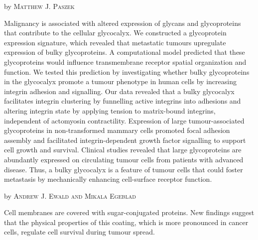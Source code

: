 \documentclass[10pt,a4paper]{article}
\newcommand{\NewsItem}[1]{ %
\usefont{T1}{fvs}{n}{n} %
\vspace{24pt}\large #1\vspace{3pt} %
\par \normalsize \normalfont}
\newcommand{\NewsAuthor}[1]{ %
\hfill by \textsc{#1} \vspace{20pt} %
\par \normalfont}
\begin{document}
\begin{multicols}{2} %


\NewsItem{{\color{hugoteal}{The cancer glycocalyx mechanically primes integrin-mediated growth and survival}}}
\NewsAuthor{Matthew J. Paszek}

Malignancy is associated with altered expression of glycans and glycoproteins that contribute to the cellular glycocalyx.
We constructed a glycoprotein expression signature, which revealed that metastatic tumours upregulate expression of bulky glycoproteins.
A computational model predicted that these glycoproteins would influence transmembrane receptor spatial organization and function.
We tested this prediction by investigating whether bulky glycoproteins in the glycocalyx promote a tumour phenotype in human cells by increasing integrin adhesion and signalling.
Our data revealed that a bulky glycocalyx facilitates integrin clustering by funnelling active integrins into adhesions and altering integrin state by applying tension to matrix-bound integrins, independent of actomyosin contractility.
Expression of large tumour-associated glycoproteins in non-transformed mammary cells promoted focal adhesion assembly and facilitated integrin-dependent growth factor signalling to support cell growth and survival.
Clinical studies revealed that large glycoproteins are abundantly expressed on circulating tumour cells from patients with advanced disease.
Thus, a bulky glycocalyx is a feature of tumour cells that could foster metastasis by mechanically enhancing cell-surface receptor function.\cite{PasDuFRos1406}


\NewsItem{{\color{hugored}{Cancer: Sugar-coated cell signalling}}}
\NewsAuthor{Andrew J. Ewald and Mikala Egeblad}

Cell membranes are covered with sugar-conjugated proteins.
New findings suggest that the physical properties of this coating, which is more pronounced in cancer cells, regulate cell survival during tumour spread.\cite{EwaEge1406}



\end{multicols}
\end{document}
